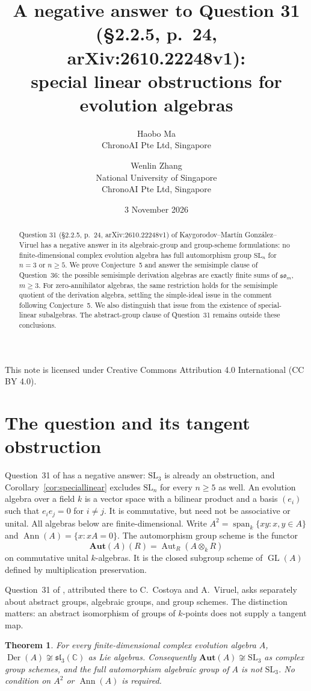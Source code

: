 \documentclass[11pt]{article}
\title{A negative answer to Question 31\texorpdfstring{\\}{ }
(\S2.2.5, p.~24, arXiv:2610.22248v1):\texorpdfstring{\\}{ }
special linear obstructions for evolution algebras}
\author{Haobo Ma\\\small ChronoAI Pte Ltd, Singapore
\and Wenlin Zhang\\\small National University of Singapore\\\small ChronoAI Pte Ltd, Singapore}
\date{3 November 2026}
\newtheorem{theorem}{Theorem}
\DeclareMathOperator{\Der}{Der}
\DeclareMathOperator{\Ann}{Ann}
\DeclareMathOperator{\Aut}{Aut}
\DeclareMathOperator{\GL}{GL}
\newcommand{\so}{\mathfrak{so}}
\newcommand{\slie}{\mathfrak{sl}}
\newcommand{\C}{\mathbb C}
\newcommand{\AutS}{\mathbf{Aut}}
\begin{document}
\maketitle
\begin{abstract}
Question 31 (\S2.2.5, p.~24, arXiv:2610.22248v1) of
Kaygorodov--Mart\'in Gonz\'alez--Viruel has a negative answer in its
algebraic-group and group-scheme formulations: no finite-dimensional complex
evolution algebra has full automorphism group $\mathrm{SL}_n$ for
$n=3$ or $n\ge5$.
We prove Conjecture~5 and answer the semisimple clause of Question~36:
the possible semisimple derivation algebras are exactly finite sums of
$\so_m$, $m\ge3$.
For zero-annihilator algebras, the same restriction holds for the semisimple
quotient of the derivation algebra, settling the simple-ideal issue in the
comment following Conjecture~5. We also distinguish that issue from the
existence of special-linear subalgebras. The abstract-group clause of
Question~31 remains outside these conclusions.
\end{abstract}
\noindent\small This note is licensed under Creative Commons Attribution 4.0
International (CC BY 4.0).\normalsize

\section{The question and its tangent obstruction}
Question~31 of \cite[\S2.2.5, p.~24]{survey} has a negative answer:
$\mathrm{SL}_3$ is already an obstruction, and
Corollary~\ref{cor:speciallinear} excludes $\mathrm{SL}_n$ for every
$n\ge5$ as well.
An evolution algebra over a field $k$ is a vector space with a bilinear product
and a basis $(e_i)$ such that $e_ie_j=0$ for $i\ne j$.
It is commutative, but need not be associative or unital.
All algebras below are finite-dimensional. Write
$A^2=\operatorname{span}_k\{xy:x,y\in A\}$ and
$\Ann(A)=\{x:xA=0\}$.
The automorphism group scheme is the functor
\[
 \AutS(A)(R)=\Aut_R(A\otimes_k R)
\]
on commutative unital $k$-algebras. It is the closed subgroup scheme of
$\GL(A)$ defined by multiplication preservation.

Question~31 of \cite[\S2.2.5, p.~24]{survey}, attributed there to
C.~Costoya and A.~Viruel, asks separately about abstract groups, algebraic
groups, and group schemes. The distinction matters: an abstract isomorphism
of groups of $k$-points does not supply a tangent map.

\begin{theorem}\label{thm:main}
For every finite-dimensional complex evolution algebra $A$,
$\Der(A)\not\cong\slie_3(\C)$ as Lie algebras. Consequently
$\AutS(A)\not\cong\mathrm{SL}_3$ as complex group schemes, and the full
automorphism algebraic group of $A$ is not $\mathrm{SL}_3$.
No condition on $A^2$ or $\Ann(A)$ is required.
\end{theorem}
\end{document}
